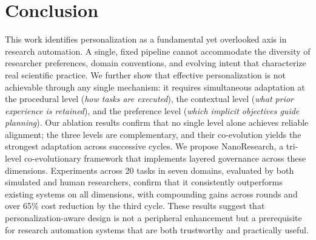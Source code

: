 \documentclass{opendatalab}
\begin{document}

\section{Conclusion}

This work identifies personalization as a fundamental yet overlooked axis in research automation. A single, fixed pipeline cannot accommodate the diversity of researcher preferences, domain conventions, and evolving intent that characterize real scientific practice. We further show that effective personalization is not achievable through any single mechanism: it requires simultaneous adaptation at the procedural level (\textit{how tasks are executed}), the contextual level (\textit{what prior experience is retained}), and the preference level (\textit{which implicit objectives guide planning}). Our ablation results confirm that no single level alone achieves reliable alignment; the three levels are complementary, and their co-evolution yields the strongest adaptation across successive cycles. We propose NanoResearch, a tri-level co-evolutionary framework that implements layered governance across these dimensions. Experiments across 20 tasks in seven domains, evaluated by both simulated and human researchers, confirm that it consistently outperforms existing systems on all dimensions, with compounding gains across rounds and over 65\% cost reduction by the third cycle. These results suggest that personalization-aware design is not a peripheral enhancement but a prerequisite for research automation systems that are both trustworthy and practically useful.
\end{document}
